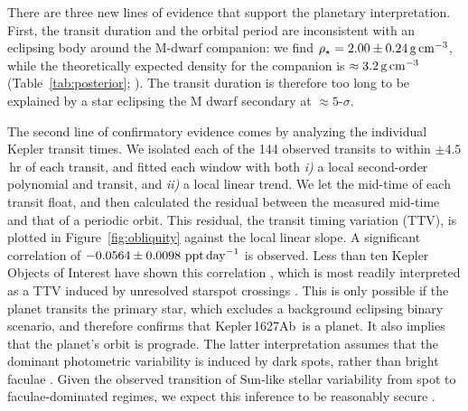 \documentclass[12pt,modern,twocolumn,tighten]{aastex63}
\newcommand{\pn}{Kepler\,1627Ab} %
\begin{document}
There are three new lines of evidence that support the planetary
interpretation.  First, the transit duration and the orbital period
are inconsistent with an eclipsing body around the M-dwarf companion:
we find $\rho_\star = 2.00 \pm 0.24\,{\rm g\,cm}^{-3}$, while the
theoretically expected density for the companion is
$\approx 3.2\,{\rm g\,cm}^{-3}$ (Table~\ref{tab:posterior};
\citealt{choi_mesa_2016}).  The transit duration is therefore too long
to be explained by a star eclipsing the M dwarf secondary at
$\approx$$5$-$\sigma$.


The second line of confirmatory evidence comes by analyzing the
individual Kepler transit times. We isolated each of the
144 observed transits to within $\pm4.5$\,hr of each transit, and
fitted each window with both {\it i)} a local second-order polynomial
and transit, and {\it ii)} a local linear trend.  We let the mid-time
of each transit float, and then calculated the residual between the
measured mid-time and that of a periodic orbit.  This
residual, the transit timing variation (TTV), is plotted in
Figure~\ref{fig:obliquity} against the local linear slope.  A
significant correlation of $-0.0564 \pm 0.0098\ {\rm ppt\,day}^{-1}$
is observed.  Less than ten Kepler Objects of Interest have shown this
correlation \citep{holczer_time_2015}, which is most readily
interpreted as a TTV induced by unresolved starspot crossings
\citep{mazeh_time_2015}.  This is only possible if the planet transits
the primary star, which excludes a background eclipsing binary
scenario, and therefore confirms that \pn\ is a planet.  It also
implies that the planet's orbit is prograde.  The latter
interpretation assumes that the dominant photometric variability is
induced by dark spots, rather than bright faculae
\citep{mazeh_time_2015}.  Given the observed transition of Sun-like
stellar variability from spot to faculae-dominated regimes, we expect
this inference to be reasonably secure
\citep{shapiro_are_2016,montet_long-term_2017,reinhold_stellar_2020}.
\end{document}
